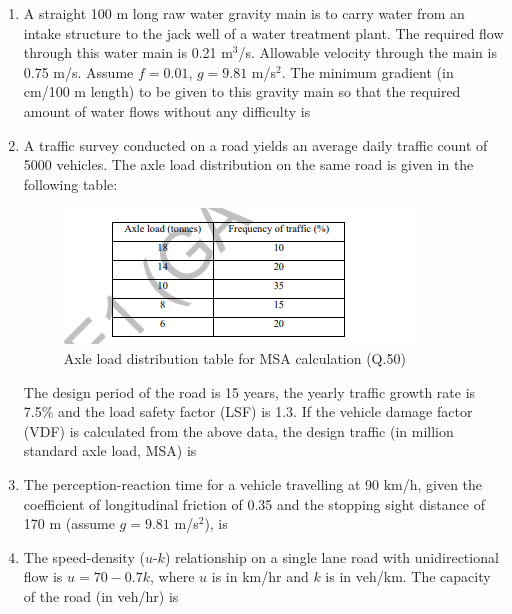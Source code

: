 \documentclass[journal,12pt,onecolumn]{IEEEtran}
\theoremstyle{remark}
\begin{document}
\begin{enumerate}
\item A straight 100 m long raw water gravity main is to carry water from an intake structure to the jack well of a water treatment plant. The required flow through this water main is 0.21 m$^3$/s. Allowable velocity through the main is 0.75 m/s. Assume $f = 0.01$, $g = 9.81$ m/s$^2$. The minimum gradient (in cm/100 m length) to be given to this gravity main so that the required amount of water flows without any difficulty is \hfill{}

\item A traffic survey conducted on a road yields an average daily traffic count of 5000 vehicles. The axle load distribution on the same road is given in the following table: \hfill{}

\begin{figure}[H]
\centering
\includegraphics[width=0.7\linewidth]{figs/image17.png}
\caption{Axle load distribution table for MSA calculation (Q.50)}
\label{fig:q50}
\end{figure}

The design period of the road is 15 years, the yearly traffic growth rate is 7.5\% and the load safety factor (LSF) is 1.3. If the vehicle damage factor (VDF) is calculated from the above data, the design traffic (in million standard axle load, MSA) is

\item The perception-reaction time for a vehicle travelling at 90 km/h, given the coefficient of longitudinal friction of 0.35 and the stopping sight distance of 170 m (assume $g = 9.81$ m/s$^2$), is \hfill{}

\item The speed-density ($u$-$k$) relationship on a single lane road with unidirectional flow is $u = 70 - 0.7k$, where $u$ is in km/hr and $k$ is in veh/km. The capacity of the road (in veh/hr) is \hfill{}





\end{enumerate}
\end{document}
